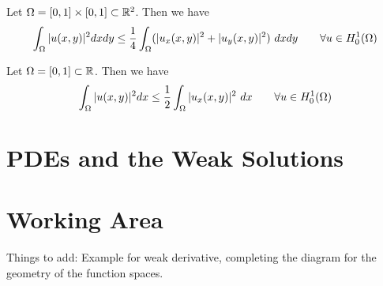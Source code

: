 \begin{example}
	Let $ \Omega = [0,1]\times [0,1] \subset \mathbb{R}^2$. Then we have
	\[ \int_\Omega|u(x,y)|^2 dxdy \leq \frac{1}{4} \int_\Omega (|u_x(x,y)|^2 + |u_y(x,y)|^2)\ dxdy \qquad \forall u \in H_0^1(\Omega) \]
\end{example}

\begin{example}
	Let $ \Omega = [0,1] \subset \mathbb{R} $. Then we have
	\[ \int_\Omega|u(x,y)|^2 dx \leq \frac{1}{2} \int_\Omega |u_x(x,y)|^2 \ dx \qquad \forall u \in H_0^1(\Omega) \]
\end{example}





\section{PDEs and the Weak Solutions}



\section{Working Area}
Things to add: Example for weak derivative, completing the diagram for the geometry of the function spaces. 